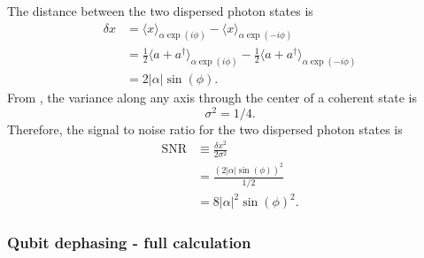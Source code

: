 The distance between the two dispersed photon states is \begin{align}
\delta x &=
\langle x \rangle_{\alpha \exp(i \phi)} - \langle x \rangle_{\alpha \exp(-i \phi)} \\
&= \frac{1}{2}\langle a + a^{\dagger} \rangle_{\alpha \exp(i \phi)} - \frac{1}{2}\langle a + a^{\dagger} \rangle_{\alpha \exp(-i \phi)} \\
&= 2| \alpha | \sin \left( \phi \right) . \end{align}
From \citeinternaltype {}, the variance along any axis through the center of a coherent state is \begin{equation}
\sigma^2 = 1/4 . \end{equation}
Therefore, the signal to noise ratio for the two dispersed photon states is \begin{align}
\text{SNR}
&\equiv \frac{\delta x^2}{2 \sigma^2} \\
&= \frac{\left( 2 | \alpha | \sin \left( \phi \right) \right)^2}{1/2} \\
&= 8 \left| \alpha \right|^2 \sin \left(\phi \right)^2 . \label{eq:dispersedSNR}
\end{align}


\subsubsection{Qubit dephasing - full calculation}

